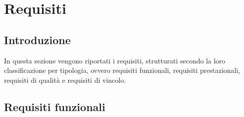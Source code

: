\section{Requisiti}
\subsection{Introduzione}
In questa sezione vengono riportati i requisiti, strutturati secondo la loro classificazione per tipologia, ovvero requisiti funzionali, requisiti prestazionali, requisiti di qualità e requisiti di vincolo.

\subsection{Requisiti funzionali}
\renewcommand{\arraystretch}{1.5}
